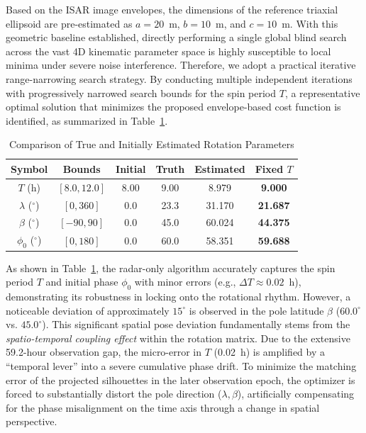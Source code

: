 \documentclass[conference]{IEEEtran}
\begin{document}
Based on the ISAR image envelopes, the dimensions of the reference triaxial ellipsoid are pre-estimated as $a=20$~m, $b=10$~m, and $c=10$~m. With this geometric baseline established, directly performing a single global blind search across the vast 4D kinematic parameter space is highly susceptible to local minima under severe noise interference. Therefore, we adopt a practical iterative range-narrowing search strategy. By conducting multiple independent iterations with progressively narrowed search bounds for the spin period $T$, a representative optimal solution that minimizes the proposed envelope-based cost function is identified, as summarized in Table~\ref{tab_estimation_results}.

\begin{table}[htbp]
	\caption{Comparison of True and Initially Estimated Rotation Parameters}
	\label{tab_estimation_results}
	\centering
	\renewcommand{\arraystretch}{1.25} %
	\setlength{\tabcolsep}{6pt}      %
	\begin{tabular}{cccccc}
		\toprule %
		\textbf{Symbol} & \textbf{Bounds} & \textbf{Initial} & \textbf{Truth} & \textbf{Estimated} & \textbf{Fixed $T$} \\ 
		\midrule %
		$T$ (h) & $[8.0, 12.0]$ & 8.00 & 9.00 & 8.979 & \textbf{9.000} \\ 
		$\lambda$ ($^{\circ}$) & $[0, 360]$ & 0.0 & 23.3 & 31.170 & \textbf{21.687} \\ 
		$\beta$ ($^{\circ}$) & $[-90, 90]$ & 0.0 & 45.0 & 60.024 & \textbf{44.375} \\ 
		$\phi_0$ ($^{\circ}$) & $[0, 180]$ & 0.0 & 60.0 & 58.351 & \textbf{59.688} \\ 
		\bottomrule %
	\end{tabular}
\end{table}

As shown in Table~\ref{tab_estimation_results}, the radar-only algorithm accurately captures the spin period $T$ and initial phase $\phi_0$ with minor errors (e.g., $\Delta T \approx 0.02$~h), demonstrating its robustness in locking onto the rotational rhythm. However, a noticeable deviation of approximately $15^{\circ}$ is observed in the pole latitude $\beta$ ($60.0^{\circ}$ vs. $45.0^{\circ}$). This significant spatial pose deviation fundamentally stems from the \textit{spatio-temporal coupling effect} within the rotation matrix. Due to the extensive 59.2-hour observation gap, the micro-error in $T$ (0.02~h) is amplified by a ``temporal lever'' into a severe cumulative phase drift. To minimize the matching error of the projected silhouettes in the later observation epoch, the optimizer is forced to substantially distort the pole direction ($\lambda, \beta$), artificially compensating for the phase misalignment on the time axis through a change in spatial perspective.
\end{document}
